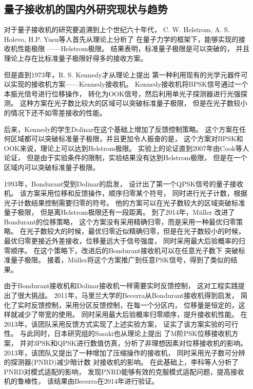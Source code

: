 \subsection{量子接收机的国内外研究现状与趋势}
对于量子接收机的研究要追溯到上个世纪六十年代，
C. W. Helstrom, A. S. Holevo, H.P. Yuen等人首先从理论上分析了
在量子力学的框架下，能够实现的接收机性能极限
——Helstrom极限\cite{helstrom1976quantum,helstrom1967detection,
yuen1975optimum,eldar2003designing}。
结果表明，标准量子极限是可以突破的，
并且理论上存在比标准量子极限好得多的接收方案。

但是直到1973年，R. S. Kennedy才从理论上提出
第一种利用现有的光学元器件可以实现的接收机方案——Kennedy接收机\cite{kennedy1973near}。
Kennedy接收机将BPSK信号通过一个本振光信号进行位移操作，
转化为OOK信号，然后利用单光子探测器进行光强探测。
这种方案在光子数比较大的区域可以突破标准量子极限，
但是在光子数较小的情况下还不如零差接收的性能。

后来，Kennedy的学生Dolinar在这个基础上增加了反馈控制策略\cite{dolinar1973optimum}。
这个方案在任何区域都可以突破标准量子极限，并且更加令人振奋的是，
这个方案对BPSK和OOK来说，理论上可以达到Helstrom极限。
实验上的论证直到2007年由Cook等人论证\cite{cook2007optical}，
但是由于实验条件的限制，实验结果没有达到Helstrom极限，
但是在一个区域内可以突破标准量子极限。

1993年，Bondurant受到Dolinar的启发，
设计出了第一个QPSK信号的量子接收机\cite{bondurant1993near}。
该方案采用位移和反馈操作，顺序归零某个符号，
同时进行光子计数，根据光子计数结果控制需要归零的符号。
他的方案可以在光子数较大的区域突破标准量子极限，
但是离Helstrom极限还有一段距离。
到了2014年，Müller 改进了Bondurant的位移策略，
这个方案没有采用精确归零，而是采用一种最优归零策略。
在光子数较大的时候，最优归零近似精确归零，但是在光子数较小的时候，
最优归零更接近外差接收，位移量远大于信号强度，
同时采用最大后验概率的归零顺序。
在这个策略下，改进后的Bondurant接收机可以在任意光子数下
突破标准量子极限\cite{muller2014qpsk}。
接着，Müller将这个方案推广到任意PSK信号，得到了类似的结果\cite{muller2014m}。

由于Bondurant接收机和Dolinar接收机一样需要实时反馈控制，
这对工程实践提出了很大挑战。
2011年，马里兰大学的Becerra从Bondurant接收机得到启发，
简化了实时反馈控制，采用分区反馈控制，在每一个分区内，
位移量是恒定的，这样就减少了带宽的使用。
同时采用最大后验概率归零顺序，提升接收机性能\cite{becerra2011m}。
在2013年，该团队采用反馈方式实现了上述实验方案\cite{becerra2013experimental}，
证实了该方案实验的可行性。
与此同时，日本研究组的Sasaki也从理论上提出
了M阶PSK位移接收机方案\cite{izumi2012displacement}，
并对3PSK和QPSK进行数值仿真，分析了非理想因素对位移接收机的影响。
2013年，该团队又提出了一种增加了压缩操作的接收机，
同时采用光子数可分辨的探测器(PNRD)减少暗计数
对接收机的影响\cite{izumi2013quantum}。
在此基础上，李科等人分析了PNRD对模式适配的影响，
发现PNRD能够有效的克服模式适配问题，提高接收机的鲁棒性\cite{li2013suppressing}，
该结果由Becerra在2014年进行验证\cite{becerra2015photon}。

